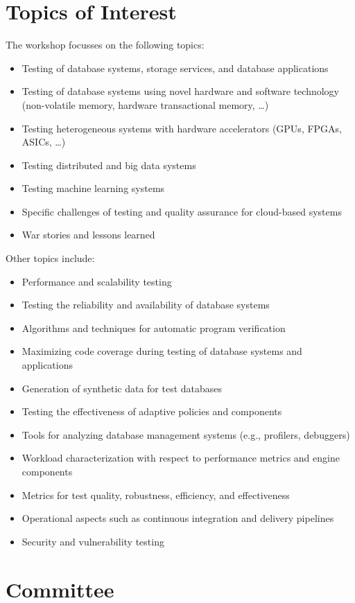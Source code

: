 \documentclass[sigconf]{acmart}
\begin{document}
\section{Topics of Interest}
The workshop focusses on the following topics:
\begin{itemize}
    \item Testing of database systems, storage services, and database applications 
    \item Testing of database systems using novel hardware and software technology (non-volatile memory, hardware transactional memory, \ldots{})
    \item Testing heterogeneous systems with hardware accelerators (GPUs, FPGAs, ASICs, …)
    \item Testing distributed and big data systems
    \item Testing machine learning systems
    \item Specific challenges of testing and quality assurance for cloud-based systems 
    \item War stories and lessons learned
\end{itemize}
Other topics include:
\begin{itemize}
    \item Performance and scalability testing
    \item Testing the reliability and availability of database systems 
    \item Algorithms and techniques for automatic program verification 
    \item Maximizing code coverage during testing of database systems and applications 
    \item Generation of synthetic data for test databases 
    \item Testing the effectiveness of adaptive policies and components 
    \item Tools for analyzing database management systems (e.g., profilers, debuggers)
    \item Workload characterization with respect to performance metrics and engine components 
    \item Metrics for test quality, robustness, efficiency, and effectiveness 
    \item Operational aspects such as continuous integration and delivery pipelines
    \item Security and vulnerability testing
\end{itemize}

\section{Committee}
\end{document}
